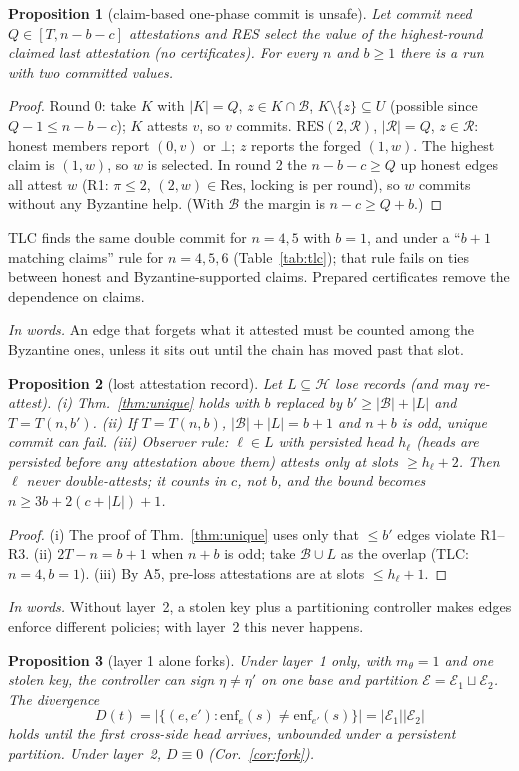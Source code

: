 \documentclass[conference]{IEEEtran}
\newtheorem{proposition}{Proposition}
\newcommand{\E}{\mathcal{E}}
\newcommand{\Hn}{\mathcal{H}}
\newcommand{\B}{\mathcal{B}}
\newcommand{\words}[1]{\par\noindent\textit{In words.} #1\par\smallskip}
\begin{document}
\begin{proposition}[claim-based one-phase commit is unsafe]\label{prop:onephase}
Let commit need $Q\in[T,n-b-c]$ attestations and RES select the value of the highest-round \emph{claimed} last attestation (no certificates). For every $n$ and $b\ge1$ there is a run with two committed values.
\end{proposition}
\begin{proof}
Round 0: take $K$ with $|K|=Q$, $z\in K\cap\B$, $K\setminus\{z\}\subseteq U$ (possible since $Q-1\le n-b-c$); $K$ attests $v$, so $v$ commits. $\mathrm{RES}(2,\mathcal R)$, $|\mathcal R|=Q$, $z\in\mathcal R$: honest members report $(0,v)$ or $\bot$; $z$ reports the forged $(1,w)$. The highest claim is $(1,w)$, so $w$ is selected. In round 2 the $n-b-c\ge Q$ up honest edges all attest $w$ (R1: $\pi\le2$, $(2,w)\in\mathrm{Res}$, locking is per round), so $w$ commits without any Byzantine help. (With $\B$ the margin is $n-c\ge Q+b$.)
\end{proof}
\noindent TLC finds the same double commit for $n{=}4,5$ with $b{=}1$, and under a ``$b{+}1$ matching claims'' rule for $n{=}4,5,6$ (Table~\ref{tab:tlc}); that rule fails on ties between honest and Byzantine-supported claims. Prepared certificates remove the dependence on claims.
\words{An edge that forgets what it attested must be counted among the Byzantine ones, unless it sits out until the chain has moved past that slot.}
\begin{proposition}[lost attestation record]\label{prop:lost}
Let $L\subseteq\Hn$ lose records (and may re-attest).
(i) Thm.~\ref{thm:unique} holds with $b$ replaced by $b'\ge|\B|+|L|$ and $T=T(n,b')$.
(ii) If $T=T(n,b)$, $|\B|+|L|=b+1$ and $n+b$ is odd, unique commit can fail.
(iii) Observer rule: $\ell\in L$ with persisted head $h_\ell$ (heads are persisted before any attestation above them) attests only at slots $\ge h_\ell+2$. Then $\ell$ never double-attests; it counts in $c$, not $b$, and the bound becomes $n\ge 3b+2(c+|L|)+1$.
\end{proposition}
\begin{proof}
(i) The proof of Thm.~\ref{thm:unique} uses only that $\le b'$ edges violate R1--R3. (ii) $2T-n=b+1$ when $n+b$ is odd; take $\B\cup L$ as the overlap (TLC: $n{=}4,b{=}1$). (iii) By A5, pre-loss attestations are at slots $\le h_\ell+1$.
\end{proof}
\words{Without layer~2, a stolen key plus a partitioning controller makes edges enforce different policies; with layer~2 this never happens.}
\begin{proposition}[layer 1 alone forks]\label{prop:s1}
Under layer~1 only, with $m_\theta=1$ and one stolen key, the controller can sign $\eta\ne\eta'$ on one base and partition $\E=\E_1\sqcup\E_2$. The divergence
\begin{equation}
D(t)=\big|\{(e,e'):\mathrm{enf}_e(s)\ne\mathrm{enf}_{e'}(s)\}\big|=|\E_1||\E_2|
\end{equation}
holds until the first cross-side head arrives, unbounded under a persistent partition. Under layer~2, $D\equiv0$ (Cor.~\ref{cor:fork}).
\end{proposition}
\end{document}
